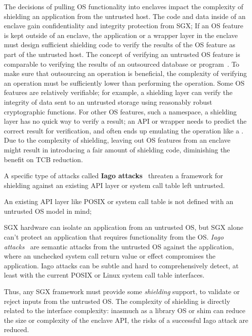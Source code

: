 The decisions of pulling OS functionality into enclaves
impact the complexity of shielding an application from the untrusted host.
The code and data inside of an enclave
gain confidentiality and integrity protection from SGX;
If an OS feature is kept outside of an enclave, the application or a wrapper layer in the enclave must design
sufficient shielding code to verify the results of the OS feature
as part of the untrusted host.
The concept of verifying an untrusted OS feature
is comparable to verifying the results of an outsourced database or program~\cite{bajaj13correctdb,zhang15integridb,ben2013snarks}.
To make sure that outsourcing an operation is beneficial,
the complexity of verifying an operation must be sufficiently lower than performing the operation.
Some OS features are relatively verifiable;
for example, a shielding layer can verify the integrity of data sent to an untrusted storage using reasonably robust cryptographic functions.
For other OS features, such a namespace,
a shielding layer has no quick way to verify a result;
an API or \linuxapi{} wrapper needs to predict the correct result for verification, and often ends up emulating the operation like a \libos{}.
Due to the complexity of shielding, leaving out OS features from an enclave might result in introducing a fair amount of shielding code, diminishing the benefit on TCB reduction.



A specific type of attacks called {\bf Iago attacks}~\cite{checkoway13iago}
threaten a framework for shielding against an existing API layer or system call table left untrusted.
~\citeauthor{checkoway13iago}



An existing API layer like POSIX or system call table is not defined with an untrusted OS model in mind;

SGX hardware can isolate an application from an untrusted OS, but 
SGX alone can't protect an application that  requires
functionality from the OS.  {\em Iago attacks}~\cite{checkoway13iago}
are semantic attacks from the untrusted OS against the application, where an unchecked system call return 
value or effect compromises the application.
Iago attacks can be subtle and hard to comprehensively detect, at least with the current
POSIX or Linux system call table interfaces.

Thus, any SGX framework must provide some {\em shielding} support, to 
validate or reject inputs from the untrusted OS.  
The complexity of shielding is directly related to the interface complexity:
inasmuch as a library OS or shim can reduce the size or complexity of the 
enclave API, 
the risks of a successful Iago attack are reduced.

